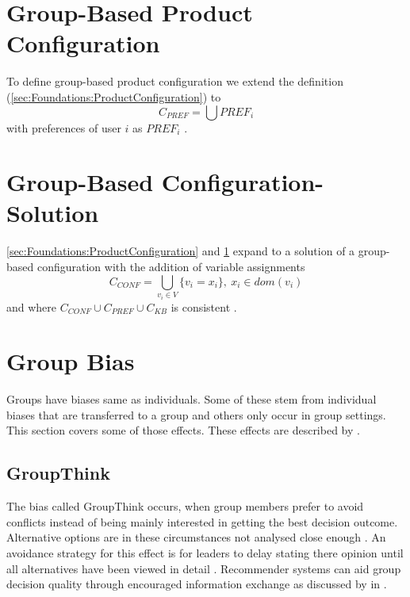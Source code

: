 \section{Group-Based Product Configuration}
\label{sec:Foundations:GroupBasedProductConfiguration}

To define group-based product configuration we extend the definition (\ref{sec:Foundations:ProductConfiguration}) to 
\[ 
    C_{PREF} = \bigcup 
PREF_i \]
with preferences of user \( i \) as \( PREF_i \) \cite{ felferningGroupBasedConfiguration2016}.

\section{Group-Based Configuration-Solution}
\label{sec:Foundations:GroupBasedConfigurationSolution}

\ref{sec:Foundations:ProductConfiguration} and \ref{sec:Foundations:GroupBasedProductConfiguration} expand to a solution of a group-based configuration with the addition of variable assignments
\[
    C_{CONF} = \bigcup_{v_i \in V} \{ v_i = x_i \}, \ x_i \in dom(v_i)
\]
and where \( C_{CONF} \cup C_{PREF} \cup C_{KB} \) is consistent \cite{ felferningGroupBasedConfiguration2016}.

\section{Group Bias}
\label{sec:Foundations:GroupBias}

Groups have biases same as individuals. Some of these stem from individual biases that are transferred to a group and others only occur in group settings. This section covers some of those effects. These effects are described by \citeauthor{felfernigBiasesGroupDecisions2018} \cite{felfernigBiasesGroupDecisions2018}.

\subsection{GroupThink}

The bias called GroupThink occurs, when group members prefer to avoid conflicts instead of being mainly interested in getting the best decision outcome. Alternative options are in these circumstances not analysed close enough \cite{janis1982groupthink}.
An avoidance strategy for this effect is for leaders to delay stating there opinion until all alternatives have been viewed in detail \citeauthor{felfernigBiasesGroupDecisions2018}. Recommender systems can aid group decision quality through encouraged information exchange as discussed by \citeauthor{atasItemRecommendationUsing2017} in \cite{atasItemRecommendationUsing2017}.


